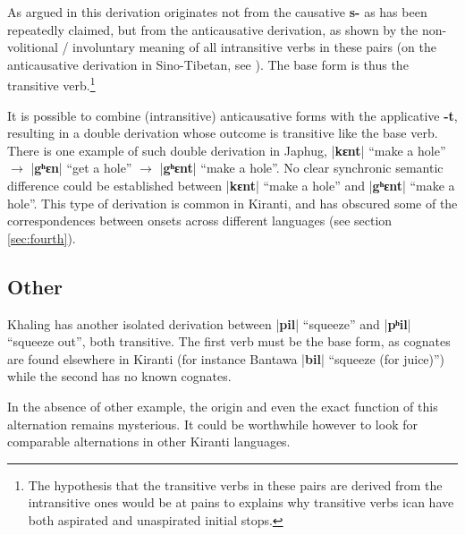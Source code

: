 \documentclass[oldfontcommands,oneside,a4paper,11pt]{article}
\newcommand{\ipa}[1]{\textbf{{\phon\mbox{#1}}}} %
\newcommand{\dhatu}[2]{|\ipa{#1}| ``#2''}
\begin{document}
As argued in \citealt{jacques15derivational.khaling} this derivation originates not from the causative \ipa{s-} as has been repeatedly claimed, but from the anticausative derivation, as shown by the non-volitional / involuntary meaning of all intransitive verbs in these pairs (on the anticausative derivation in Sino-Tibetan, see  \citealt{jacques15spontaneous, jacques15causative}). The base form is thus the transitive verb.\footnote{The hypothesis that the transitive verbs in these pairs are derived from the intransitive ones would be at pains to explains why transitive verbs ican have both aspirated and unaspirated initial stops.}

It is possible to combine (intransitive) anticausative forms with the applicative \ipa{-t}, resulting in a double derivation whose outcome is transitive like the base verb. There is one example of such double derivation in Japhug, \dhatu{kɛnt}{make a hole} $\rightarrow$  \dhatu{gʰɛn}{get a hole} $\rightarrow$  \dhatu{gʰɛnt}{make a hole}. No clear synchronic semantic difference could be established between \dhatu{kɛnt}{make a hole} and \dhatu{gʰɛnt}{make a hole}. This type of derivation is common in Kiranti, and has obscured some of the correspondences between onsets across different languages (see section \ref{sec:fourth}).

\subsection{Other}
Khaling has another isolated derivation between \dhatu{pil}{squeeze} and  \dhatu{pʰil}{squeeze out}, both transitive. The first verb must be the base form, as cognates are found elsewhere in Kiranti (for instance Bantawa \dhatu{bil}{squeeze (for juice)}) while the second has no known cognates. 

In the absence of other example, the origin and even the exact function of this alternation remains mysterious. It could be worthwhile however to look for comparable alternations in other Kiranti languages.
\end{document}
